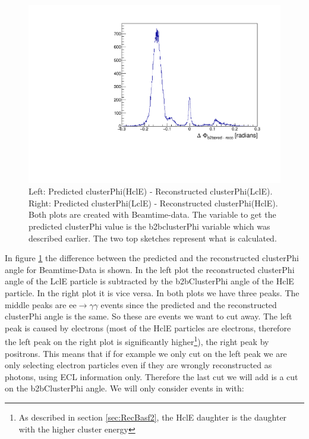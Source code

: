 \documentclass[a4paper,11pt,twosided,final,german,openbib,pdftex,listof=totoc,bibliography=totoc]{scrbook}
\begin{document}
\begin{figure}[h!]
\begin{minipage}[b]{0.45\linewidth}
		\includegraphics[width=\textwidth]{Cuts/Data/b2b_ProbeTag.pdf}
	\end{minipage}
	\caption[b2bClusterPhi - clusterPhi For Beamtime-Data]{Left: Predicted clusterPhi(HclE) - Reconstructed clusterPhi(LclE). Right: Predicted clusterPhi(LclE) - Reconstructed clusterPhi(HclE). Both plots are created with Beamtime-data. The variable to get the predicted clusterPhi value is the b2bclusterPhi variable which was described earlier. The two top sketches represent what is calculated.}
	\label{fig:b2bData}
\end{figure}

In figure \ref{fig:b2bData} the difference between the predicted and the reconstructed clusterPhi angle for Beamtime-Data is shown. In the left plot the reconstructed clusterPhi angle of the LclE particle is subtracted by the b2bClusterPhi angle of the HclE particle. In the right plot it is vice versa. In both plots we have three peaks. The middle peaks are $\textrm{ee} \rightarrow \gamma \gamma$ events since the predicted and the reconstructed clusterPhi angle is the same. So these are events we want to cut away. The left peak is caused by electrons (most of the HclE particles are electrons, therefore the left peak on the right plot is significantly higher\footnote{As described in section \ref{sec:RecBasf2}, the HclE daughter is the daughter with the higher cluster energy}), the right peak by positrons. This means that if for example we only cut on the left peak we are only selecting electron particles even if they are wrongly reconstructed as photons, using ECL information only. 
Therefore the last cut we will add is a cut on the b2bClusterPhi angle. We will only consider events in with:
\newline
\end{document}
